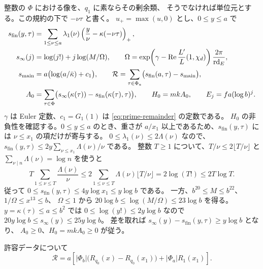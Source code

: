 整数の \(\Phi\) における像を、\(q_1\) に素ならその剰余類、
そうでなければ単位元とする。この規約の下で \(-\nu\tau\) と書く。
\(u_+=\max(u,0)\) とし、\(0\le y\le a\) で
\begin{align*}
 s_{\mathrm{fin}}(y,\tau)
   &=\sum_{1\le\nu\le a}\lambda_1(\nu)
      \left(\frac{y}{\nu}-\kappa(-\nu\tau)\right)_+,\\
 s_{\infty}(j)&=\log(j!)+j\log(M/\Omega),\qquad
 \Omega=
    \exp\!\left(\gamma-\operatorname{Re}\frac{L'}{L}(1,\chi_d)\right)
        \frac{2\pi}{\mathrm{rd}_E},\\
 s_{\mathrm{main}}&=a\bigl(\log(a/\bar\kappa)+c_1\bigr),\qquad
 \mathcal R=\sum_{\tau\in\Phi_a}\bigl(s_{\mathrm{fin}}(a,\tau)-s_{\mathrm{main}}\bigr),\\
 A_0&=\sum_{\tau\in\Phi}
       \bigl(s_\infty(\kappa(\tau))-s_{\mathrm{fin}}(\kappa(\tau),\tau)\bigr),
 \qquad H_0=mkA_0,\qquad E_j=fa(\log b)^j .
\end{align*}
\(\gamma\) は Euler 定数、\(c_1=G_1(1)\) は \eqref{eq:prime-remainder} の定数である。
\(H_0\) の非負性を確認する。\(0\le y\le a\) のとき、重さが
\(a/x_1\) 以上であるため、\(s_{\mathrm{fin}}(y,\tau)\) には
\(\nu\le x_1\) の項だけが寄与する。
\(0\le\lambda_1(\nu)\le2\Lambda(\nu)\) なので、
\(s_{\mathrm{fin}}(y,\tau)\le2y\sum_{\nu\le x_1}\Lambda(\nu)/\nu\) である。
整数 \(T\ge1\) について、\(T/\nu\le2\lfloor T/\nu\rfloor\) と
\(\sum_{\nu\mid n}\Lambda(\nu)=\log n\) を使うと
\[
 T\sum_{1\le\nu\le T}\frac{\Lambda(\nu)}{\nu}
 \le2\sum_{1\le\nu\le T}\Lambda(\nu)\lfloor T/\nu\rfloor
 =2\log(T!)\le2T\log T .
\]
従って \(0\le s_{\mathrm{fin}}(y,\tau)\le4y\log x_1\le y\log b\) である。
一方、\(b^{20}\le M\le b^{22}\)、\(1/\Omega\le x^{13}\le b\)、
\(\Omega\le1\) から \(20\log b\le\log(M/\Omega)\le23\log b\) を得る。
\(y=\kappa(\tau)\le a\le b^2\) では \(0\le\log(y!)\le2y\log b\) なので
\(20y\log b\le s_\infty(y)\le25y\log b\)。
差を取れば \(s_\infty(y)-s_{\mathrm{fin}}(y,\tau)\ge y\log b\) となり、
\(A_0\ge0\)、\(H_0=mkA_0\ge0\) が従う。

\begin{proposition}\label{prop:total-remainder}
許容データについて
\begin{equation}\label{eq:total-remainder}
 \mathcal R =
 a\left[
 |\Phi_b|\bigl(R_{q_0}(x)-R_{q_0}(x_1)\bigr)
 +|\Phi_a|R_1(x_1)
 \right].
\end{equation}
\end{proposition}

